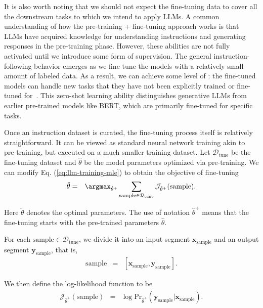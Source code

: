 It is also worth noting that we should not expect the fine-tuning data to cover all the downstream tasks to which we intend to apply LLMs. A common understanding of how the pre-training + fine-tuning approach works is that LLMs have acquired knowledge for understanding instructions and generating responses in the pre-training phase. However, these abilities are not fully activated until we introduce some form of supervision. The general instruction-following behavior emerges as we fine-tune the models with a relatively small amount of labeled data. As a result, we can achieve some level of : the fine-tuned models can handle new tasks that they have not been explicitly trained or fine-tuned for~\cite{sanh-etal:2022multitask,wei-etal:2022finetuned}. This zero-shot learning ability distinguishes generative LLMs from earlier pre-trained models like BERT, which are primarily fine-tuned for specific tasks.

Once an instruction dataset is curated, the fine-tuning process itself is relatively straightforward. It can be viewed as standard neural network training akin to pre-training, but executed on a much smaller training dataset. Let $\mathcal{D}_{\mathrm{tune}}$ be the fine-tuning dataset and $\hat{\theta}$ be the model parameters optimized via pre-training. We can modify Eq. (\ref{eq:llm-training-mle}) to obtain the objective of fine-tuning
\begin{eqnarray}
\tilde{\theta} & = & \argmax_{\hat{\theta}^+} \sum_{\mathrm{sample} \in \mathcal{D}_{\mathrm{tune}}} \mathcal{J}_{\hat{\theta}^+}(\mathrm{sample}) \label{eq:llm-fine-tuning-mle}.
\end{eqnarray}

\noindent Here $\tilde{\theta}$ denotes the optimal parameters. The use of notation $\hat{\theta}^+$ means that the fine-tuning starts with the pre-trained parameters $\hat{\theta}$.

For each $\mathrm{sample} \in \mathcal{D}_{\mathrm{tune}}$, we divide it into an input segment $\mathbf{x}_{\mathrm{sample}}$ and an output segment $\mathbf{y}_{\mathrm{sample}}$, that is,
\begin{eqnarray}
\mathrm{sample} & = & [\mathbf{x}_{\mathrm{sample}}, \mathbf{y}_{\mathrm{sample}}].
\end{eqnarray}

We then define the log-likelihood function to be
\begin{eqnarray}
\mathcal{J}_{\hat{\theta}^+}(\mathrm{sample}) & = & \log \mathrm{Pr}_{\hat{\theta}^+}(\mathbf{y}_{\mathrm{sample}}|\mathbf{x}_{\mathrm{sample}}). \label{eq:fining-tuning-loss-sample}
\end{eqnarray}

